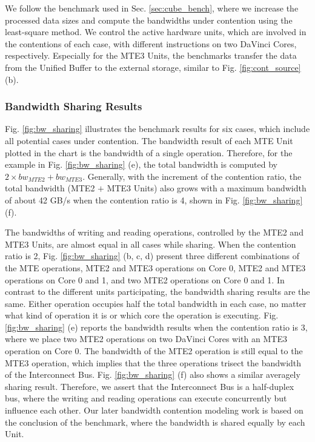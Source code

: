 We follow the benchmark used in Sec. \ref{sec:cube_bench}, where we increase the processed data sizes and compute the bandwidths under contention using the least-square method. We control the active hardware units, which are involved in the contentions of each case, with different instructions on two DaVinci Cores, respectively. Especially for the MTE3 Units, the benchmarks transfer the data from the Unified Buffer to the external storage, similar to Fig. \ref{fig:cont_source} (b).

\subsubsection{Bandwidth Sharing Results \label{sec:bw_sr_res}}

Fig. \ref{fig:bw_sharing} illustrates the benchmark results for six cases, which include all potential cases under contention. The bandwidth result of each MTE Unit plotted in the chart is the bandwidth of a single operation. Therefore, for the example in Fig. \ref{fig:bw_sharing} (e), the total bandwidth is computed by $2 \times bw_{MTE2} + bw_{MTE3}$. Generally, with the increment of the contention ratio, the total bandwidth (MTE2 $+$ MTE3 Units) also grows with a maximum bandwidth of about 42 GB/s when the contention ratio is 4, shown in Fig. \ref{fig:bw_sharing} (f). 

The bandwidths of writing and reading operations, controlled by the MTE2 and MTE3 Units, are almost equal in all cases while sharing. When the contention ratio is 2, Fig. \ref{fig:bw_sharing} (b, c, d) present three different combinations of the MTE operations, MTE2 and MTE3 operations on Core 0, MTE2 and MTE3 operations on Core 0 and 1, and two MTE2 operations on Core 0 and 1. In contrast to the different units participating, the bandwidth sharing results are the same. Either operation occupies half the total bandwidth in each case, no matter what kind of operation it is or which core the operation is executing. Fig. \ref{fig:bw_sharing} (e) reports the bandwidth results when the contention ratio is 3, where we place two MTE2 operations on two DaVinci Cores with an MTE3 operation on Core 0. The bandwidth of the MTE2 operation is still equal to the MTE3 operation, which implies that the three operations trisect the bandwidth of the Interconnect Bus. Fig. \ref{fig:bw_sharing} (f) also shows a similar averagely sharing result. Therefore, we assert that the Interconnect Bus is a half-duplex bus, where the writing and reading operations can execute concurrently but influence each other. Our later bandwidth contention modeling work is based on the conclusion of the benchmark, where the bandwidth is shared equally by each Unit.

